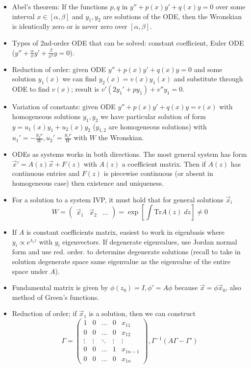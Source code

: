 \documentclass[10pt]{report}
\begin{document}
\begin{itemize}
    \item Abel's theorem: If the functions $p,q$ in $y'' + p(x) y' + q(x)y = 0$ over some interval $x\in[\alpha,\beta]$ and $y_1,y_2$ are solutions of the ODE, then the Wronskian is identically zero or is never zero over $\left[ \alpha,\beta \right]$. 
    \item Types of 2nd-order ODE that can be solved: constant coefficient, Euler ODE ($y'' + \frac{\alpha}{x}y' + \frac{\beta}{x^2}y = 0$).
    \item Reduction of order: given ODE $y'' + p(x) y' + q(x) y = 0$ and some solution $y_1(x)$ we can find $y_2(x) = v(x)y_1(x)$ and substitute through ODE to find $v(x)$; result is $v'(2y_1' + py_1) + v''y_1 = 0$.
    \item Variation of constants: given ODE $y'' + p(x)y' + q(x) y = r(x)$ with homogeneous solutions $y_1, y_2$ we have particular solution of form $y = u_1(x) y_1 + u_2(x) y_2$ ($y_{1,2}$ are homogeneous solutions) with $u_1' = -\frac{y_2r}{W}, u_2' = \frac{y_1r}{W}$ with $W$ the Wronskian.
    \item ODEs as systems works in both directions. The most general system has form $\vec{x}' = A(z)\vec{x} + F(z)$ with $A(z)$ a coefficient matrix. Then if $A(z)$ has continuous entries and $F(z)$ is piecewise continuous (or absent in homogeneous case) then existence and uniqueness.
    \item For a solution to a system IVP, it must hold that for general solutions $\vec{x}_i$
        $$W = \begin{pmatrix} \vec{x}_1 & \vec{x}_2&\dots \end{pmatrix} = \exp\left[ \int \mathrm{Tr}A(z)\; dz \right]\neq 0$$
    \item If $A$ is constant coefficients matrix, easiest to work in eigenbasis where $y_i \propto e^{\lambda_i z}$ with $y_i$ eigenvectors. If degenerate eigenvalues, use Jordan normal form and use red. order. to determine degenerate solutions (recall to take in solution degenerate space same eigenvalue as the eigenvalue of the entire space under $A$). 
    \item Fundamental matrix is given by $\phi(z_0) = I, \phi' = A\phi$ because $\vec{x} = \phi \vec{x}_0$, also method of Green's functions. 
    \item Reduction of order; if $\vec{x}_1$ is a solution, then we can construct
        $$\Gamma = \begin{pmatrix} 1 & 0 & \dots & 0 & x_{11}\\0 & 0 & \dots & 0 & x_{12} \\\vdots & \vdots & \ddots & \vdots & \vdots\\0 & 0 &\dots & 1 & x_{1n-1}\\0 & 0 &\dots & 0 & x_{1n} \end{pmatrix}, \Gamma^{-1}(A\Gamma - \Gamma') $$

\end{itemize}
\end{document}
